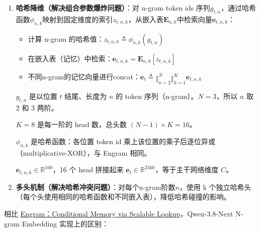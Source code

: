 \documentclass[zihao=false,fontset=windows]{ctexart}
\begin{document}
\begin{enumerate}
\item[\textcolor{feishuBlue}{1.}] \textbf{哈希降维（解决组合参数爆炸问题）}：对 n-gram token ids 序列$g_{t,n}$，通过哈希函数$\phi_{n,k}$映射到固定维度的索引$z_{t,n,k}$，从嵌入表$\mathbf E_{n,k}$中检索向量$\mathbf e_{t,n,k}$：
\begin{itemize}
\item 计算 n-gram 的哈希值：$z_{t,n,k}\triangleq\phi_{n,k}(g_{t,n})$
\item 在嵌入表（记忆）中检索：$\mathbf e_{t,n,k}=\mathbf E_{n,k}[z_{t,n,k}]$
\item 不同n-gram的记忆向量进行concat：$\mathbf e_t\triangleq\mathop{\Vert}_{n=2}^{N}\mathop{\Vert}_{k=1}^{K}\mathbf e_{t,n,k}$
\end{itemize}
\begin{feishuquote}
$g_{t,n}$ 是以位置 $t$ 结尾、长度为 $n$ 的 token 序列（n-gram）。$N=3$，所以 $n$ 取 2 和 3 两阶。

$K=8$ 是每一阶的 head 数，总头数 $(N-1)\times K=16$。

$\phi_{n,k}$ 是哈希函数：各位置 token id 乘上该位置的乘子后逐位异或（multiplicative-XOR），与 Engram 相同。

$\mathbf e_{t,n,k}\in\mathbb R^{160}$，16 个 head 拼接起来 $\mathbf e_t\in\mathbb R^{2560}$，等于主干网络维度 $C$。

\end{feishuquote}
\item[\textcolor{feishuBlue}{2.}] \textbf{多头机制（解决哈希冲突问题）}：对每个n-gram阶数$n$，使用 k 个独立哈希头（\textcolor{feishuRed}{每个头使用相同的哈希函数和不同嵌入表}），降低哈希碰撞的影响。
\end{enumerate}
相比 \href{https://my.feishu.cn/wiki/JwXTw0oUeimyoBk2QIgcSfBfn9g}{Engram：Conditional Memory via Scalable Lookup}，Qwen-3.8-Next N-gram Embedding 实现上的区别：
\end{document}

